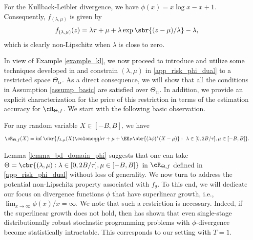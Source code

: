 \documentclass[9pt]{article}
\numberwithin{equation}{section}
\begin{document}
\begin{example}\label{example_kl}
For the Kullback-Leibler divergence, we have $\phi(x) = x\log x - x +1$.
Consequently, $f_{(\lambda, \mu)}$ is given by  \cite[Example 3.6]{shapiro2017distributionally}
\begin{align*}
   f_{(\lambda, \mu)} (z) = \lambda \tau + \mu + \lambda \exp \sbr{(z-\mu)/\lambda} - \lambda,
\end{align*}
which is clearly non-Lipschitz when $\lambda$ is close to zero. 
\end{example}


In view of Example \ref{example_kl}, we now proceed to introduce and utilize some techniques  developed in \cite{li2026sample} and  constrain $(\lambda, \mu)$ in \eqref{app_risk_phi_dual} to a restricted space $\Theta_{\mathrm{tr}}$. 
As a direct consequence, we will show that all the conditions in Assumption \ref{assump_basic} are satisfied over $\Theta_{\mathrm{tr}}$.
In addition, we provide an explicit characterization for the price of this restriction in terms of the estimation accuracy for $\cR_{\Theta, f}$. 
We start with the following basic observation. 

\begin{lemma}\label{lemma_bd_domain_phi}
For any random variable $X \in [-B, B]$, we have 
\begin{align*}
\cR_{\Theta, f} (X) =  \inf
    \cbr{ f_{\lambda, \mu}(X) \coloneqq  \lambda \tau + \mu + 
    \EE_P \sbr{ (\lambda \phi)^* (X - \mu) }: ~ \lambda \in [0, 2B/\tau], \mu \in [-B, B] }.
\end{align*}
\end{lemma}

 Lemma \ref{lemma_bd_domain_phi} suggests that one can take $\Theta = \cbr{(\lambda, \mu): \lambda \in [0, 2B/\tau], \mu \in [-B, B]}$ in $\cR_{\Theta, f}$ defined in \eqref{app_risk_phi_dual} without loss of generality.
 We now turn to address the potential non-Lipschitz property associated with $f_{\theta}$. 
 To this end, we will dedicate our focus on divergence functions $\phi$ that have superlinear growth, i.e., $\lim_{x \to \infty} \phi(x) / x = \infty$.
 We note that such a restriction is necessary. 
 Indeed,  if the superlinear growth does not hold, then \cite{li2026sample} has shown that 
even single-stage distributionally robust stochastic programming problems with $\phi$-divergence become statistically intractable. 
This corresponds to our setting with $T = 1$. 
\end{document}
